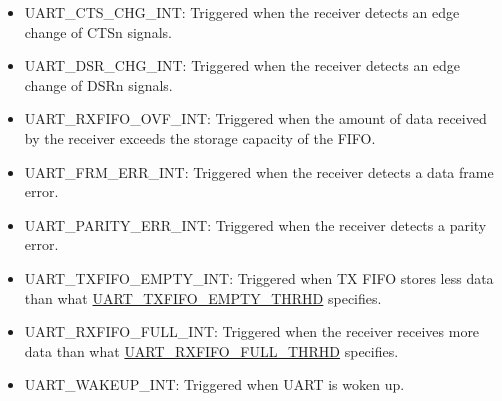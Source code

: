 \documentclass[main\_\_EN.tex]{subfiles}
\begin{document}
\begin{itemize}
\item \label{int:UARTCTSCHGINT}UART\_CTS\_CHG\_INT: Triggered when the receiver detects an edge change of CTSn signals.
\item \label{int:UARTDSRCHGINT}UART\_DSR\_CHG\_INT: Triggered when the receiver detects an edge change of DSRn signals.
\item \label{int:UARTRXFIFOOVFINT}UART\_RXFIFO\_OVF\_INT: Triggered when the amount of data received by the receiver exceeds the storage capacity of the FIFO.
\item \label{int:UARTFRMERRINT}UART\_FRM\_ERR\_INT: Triggered when the receiver detects a data frame error.
\item \label{int:UARTPARITYERRINT}UART\_PARITY\_ERR\_INT: Triggered when the receiver detects a parity error.
\item \label{int:UARTTXFIFOEMPTYINT}UART\_TXFIFO\_EMPTY\_INT: Triggered when TX FIFO stores less data than what \hyperref[fielddesc:UARTTXFIFOEMPTYTHRHD]{UART\_TXFIFO\_EMPTY\_THRHD} specifies.
\item \label{int:UARTRXFIFOFULLINT}UART\_RXFIFO\_FULL\_INT: Triggered when the receiver receives more data than what \hyperref[fielddesc:UARTRXFIFOFULLTHRHD]{UART\_RXFIFO\_FULL\_THRHD} specifies.
\item \label{int:UARTWAKEUPINT}UART\_WAKEUP\_INT: Triggered when UART is woken up.
\end{itemize}
\end{document}

